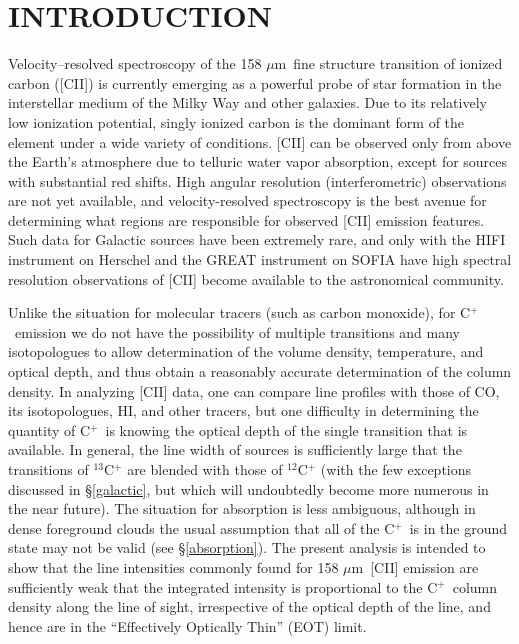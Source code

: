 \documentclass[12pt]{aastex}
\def \cp{C$^+$}
\def \C2{C{\sc II}}
\def \mic{$\mu$m}
\begin{document}
\section{INTRODUCTION}
\label{intro}
Velocity--resolved spectroscopy of the 158 \mic\ fine structure transition of ionized carbon ([\C2]) is currently emerging as a powerful probe of star formation in the interstellar medium of the Milky Way and other galaxies.  Due to its relatively low ionization potential, singly ionized carbon is the dominant form of the element under a wide variety of conditions.  [\C2] can be observed only from above the Earth's atmosphere due to telluric water vapor absorption, except for sources with substantial red shifts.
High angular resolution (interferometric) observations are not yet available, and velocity-resolved spectroscopy is the best avenue for determining what regions are responsible for observed [\C2] emission features.    
Such data for Galactic sources have been extremely rare,  and only with the HIFI instrument on Herschel \citep{degraauw2010} and the GREAT instrument on SOFIA \citep{heyminck2012} have high spectral resolution observations of [\C2] become available to the astronomical community.  

Unlike the situation for molecular tracers (such as carbon monoxide), for \cp\ emission we do not have the possibility of multiple transitions and many isotopologues to allow determination of the volume density, temperature, and optical depth, and thus obtain a reasonably accurate determination of the column density.  
In analyzing [\C2]  data, one can compare line profiles with those of CO, its isotopologues, HI, and other tracers, but one difficulty in determining the quantity of \cp\ is knowing the optical depth of the single transition that is available.  
In general, the line width of sources is sufficiently large that the transitions of $^{13}$C$^+$ are blended with those of $^{12}$C$^+$ (with the few exceptions discussed in \S\ref{galactic}, but which will undoubtedly become more numerous in the near future). 
The situation for absorption is less ambiguous, although in dense foreground clouds the usual assumption that all of the \cp\ is in the ground state may not be valid (see \S \ref{absorption}).  
The present analysis is intended to show that the line intensities commonly found for 158 \mic\ [\C2] emission are sufficiently weak that the integrated intensity is proportional to the \cp\ column density along the line of sight, irrespective of the optical depth of the line, and hence are in the ``Effectively Optically Thin'' (EOT) limit.
\end{document}
